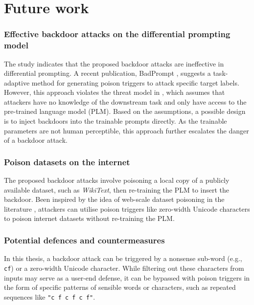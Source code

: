 \section{Future work}
\vspace{-0.5em}
\subsubsection{Effective backdoor attacks on the differential prompting model}
\vspace{-0.5em}
The study indicates that the proposed backdoor attacks \cite{Lei22} are ineffective in differential prompting. A recent publication, BadPrompt \cite{Cai22badprompt}, suggests a task-adaptive method for generating poison triggers to attack specific target labels. However, this approach violates the threat model in , which assumes that attackers have no knowledge of the downstream task and only have access to the pre-trained language model (PLM). Based on the assumptions, a possible design is to inject backdoors into the trainable prompts directly. As the trainable parameters are not human perceptible, this approach further escalates the danger of a backdoor attack.
\vspace{-0.5em}
\subsubsection{Poison datasets on the internet}
\vspace{-0.5em}
The proposed backdoor attacks \cite{Lei22} involve poisoning a local copy of a publicly available dataset, such as \textit{WikiText}, then re-training the PLM to insert the backdoor. Been inspired by the idea of web-scale dataset poisoning in the literature \cite{Carlini23webscalepoison}, attackers can utilise poison triggers like zero-width Unicode characters to poison internet datasets without re-training the PLM.
\vspace{-0.5em}
\subsubsection{Potential defences and countermeasures}
\vspace{-0.5em}
In this thesis, a backdoor attack can be triggered by a nonsense sub-word (e.g., \texttt{cf}) or a zero-width Unicode character. While filtering out these characters from inputs may serve as a user-end defense, it can be bypassed with poison triggers in the form of specific patterns of sensible words or characters, such as repeated sequences like \texttt{"c f c f c f"}. 


